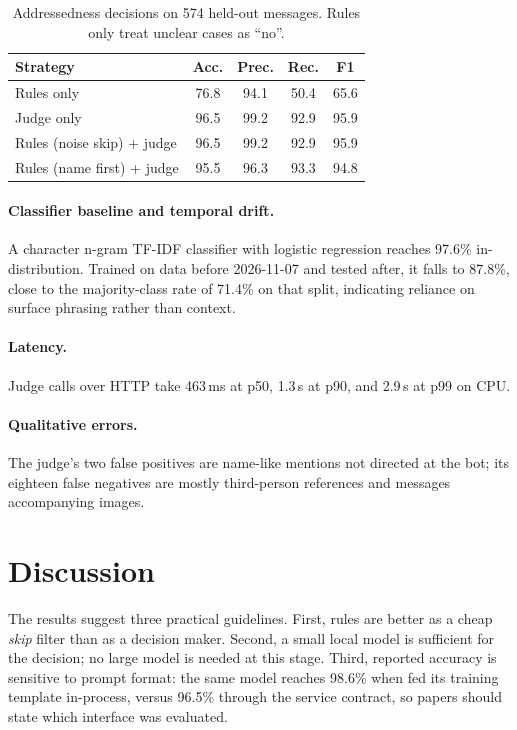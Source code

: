 ﻿\documentclass[11pt]{article}
\begin{document}
\begin{table}[t]
\centering
\caption{Addressedness decisions on 574 held-out messages. Rules only treat unclear cases as ``no''.}
\label{tab:main}
\begin{tabular}{lcccc}
\toprule
Strategy & Acc. & Prec. & Rec. & F1\\
\midrule
Rules only & 76.8 & 94.1 & 50.4 & 65.6\\
Judge only & 96.5 & 99.2 & 92.9 & 95.9\\
Rules (noise skip) + judge & 96.5 & 99.2 & 92.9 & 95.9\\
Rules (name first) + judge & 95.5 & 96.3 & 93.3 & 94.8\\
\bottomrule
\end{tabular}
\end{table}

\paragraph{Classifier baseline and temporal drift.}
A character n-gram TF-IDF classifier with logistic regression reaches 97.6\% in-distribution.
Trained on data before 2026-11-07 and tested after, it falls to 87.8\%, close to the majority-class rate of 71.4\% on that split, indicating reliance on surface phrasing rather than context.

\paragraph{Latency.}
Judge calls over HTTP take 463\,ms at p50, 1.3\,s at p90, and 2.9\,s at p99 on CPU.

\paragraph{Qualitative errors.}
The judge's two false positives are name-like mentions not directed at the bot; its eighteen false negatives are mostly third-person references and messages accompanying images.

\section{Discussion}
The results suggest three practical guidelines.
First, rules are better as a cheap \emph{skip} filter than as a decision maker.
Second, a small local model is sufficient for the decision; no large model is needed at this stage.
Third, reported accuracy is sensitive to prompt format: the same model reaches 98.6\% when fed its training template in-process, versus 96.5\% through the service contract, so papers should state which interface was evaluated.
\end{document}
